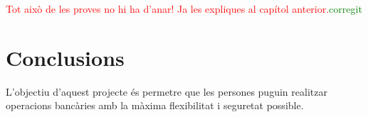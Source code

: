 \documentclass[a4paper,12pt,twoside]{ThesisStyle}
\newcommand{\pau}[1]{\textcolor{red}{#1}}
\newcommand{\sudan}[1]{\textcolor{green}{#1}}
\begin{document}
\pau{Tot això de les proves no hi ha d'anar! Ja les expliques al capítol anterior.}\sudan{corregit}








\chapter{Conclusions}
\label{chp:conclusions}


L'objectiu d'aquest projecte és permetre que les persones puguin realitzar operacions bancàries amb la màxima flexibilitat i seguretat possible.\\
\end{document}
